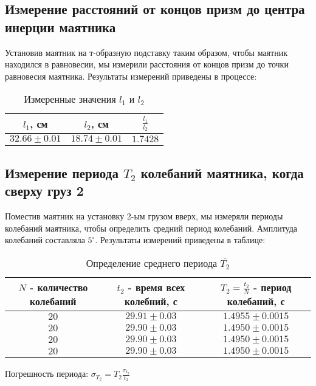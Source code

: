 \documentclass[a4paper]{article}
\begin{document}
\subsection{Измерение расстояний от концов призм до центра инерции маятника}

Установив маятник на т-образную подставку таким образом, чтобы маятник находился в равновесии, мы измерили расстояния от концов призм до точки равновесия маятника. Результаты измерений приведены в процессе:

\begin{table}[h!]
\centering
\caption{Измеренные значения $l_1$ и $l_2$}
\begin{tabular}{|c|c|c|}
\hline
$l_1$, см & $l_2$, см & $\frac{l_1}{l_2}$  \\ \hline
$32.66\pm{0.01}$  & $18.74\pm{0.01}$ & $1.7428$  \\ \hline
\end{tabular}
\end{table}

\subsection{Измерение периода $T_2$ колебаний маятника, когда сверху груз 2}

Поместив маятник на установку 2-ым грузом вверх, мы измеряли периоды колебаний маятника, чтобы определить средний период колебаний. Амплитуда колебаний составляла $5^{\circ}$. Результаты измерений приведены в таблице:

\begin{table}[h!]
\centering
\caption{Определение среднего периода $\overline{T_2}$}
\begin{tabular}{|c|c|c|}
\hline
$N$ - количество колебаний & $t_2$ - время всех колебний, с & $T_2 = \frac{t_2}{N}$ - период колебаний, с  \\ \hline
$20$  & $29.91\pm{0.03}$ & $1.4955\pm{0.0015}$   \\ \hline
$20$  & $29.90\pm{0.03}$ & $1.4950\pm{0.0015}$   \\ \hline
$20$  & $29.90\pm{0.03}$ & $1.4950\pm{0.0015}$   \\ \hline
$20$  & $29.90\pm{0.03}$ & $1.4950\pm{0.0015}$   \\ \hline
\end{tabular}
\end{table}

\item Погрешность периода: $\sigma_{T_2} = T_2\frac{\sigma_{t_2}}{t_2}$
\end{document}
